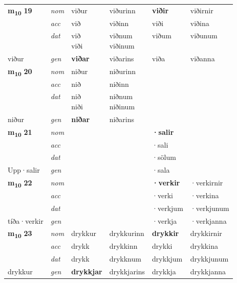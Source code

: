 \begin{longtable}[l]{X>{\footnotesize\itshape}XXXXX}
\multirow{3}{*}{{{\textbf{m{\textsubscript{10}}} \Large{\textbf{19}}}}} & nom & viður & viðurinn & \textbf{viðir} & viðirnir \\*
 & acc & við & viðinn & viði & viðina \\*
 & dat & \specialcell{við\\ viði} & \specialcell{viðnum\\ viðinum} & viðum & viðunum \\*
 {\footnotesize{viður}} & gen & \textbf{viðar} & viðarins & viða & viðanna \\
\cmidrule{1-6}

\multirow{3}{*}{{{\textbf{m{\textsubscript{10}}} \Large{\textbf{20}}}}} & nom & niður & niðurinn & \textbf{} &  \\*
 & acc & nið & niðinn &  &  \\*
 & dat & \specialcell{nið\\ niði} & \specialcell{niðnum\\ niðinum} &  &  \\*
 {\footnotesize{niður}} & gen & \textbf{niðar} & niðarins &  &  \\
\cmidrule{1-6}

\multirow{3}{*}{{{\textbf{m{\textsubscript{10}}} \Large{\textbf{21}}}}} & nom &  &  & \textbf{·salir} &  \\*
 & acc &  &  & ·sali &  \\*
 & dat &  &  & ·sölum &  \\*
 {\footnotesize{Upp\allowbreak ·salir}} & gen & \textbf{} &  & ·sala &  \\
\cmidrule{1-6}

\multirow{3}{*}{{{\textbf{m{\textsubscript{10}}} \Large{\textbf{22}}}}} & nom &  &  & \textbf{·verkir} & ·verkirnir \\*
 & acc &  &  & ·verki & ·verkina \\*
 & dat &  &  & ·verkjum & ·verkjunum \\*
 {\footnotesize{tíða\allowbreak ·verkir}} & gen & \textbf{} &  & ·verkja & ·verkjanna \\
\cmidrule{1-6}

\multirow{3}{*}{{{\textbf{m{\textsubscript{10}}} \Large{\textbf{23}}}}} & nom & drykkur & drykkurinn & \textbf{drykkir} & drykkirnir \\*
 & acc & drykk & drykkinn & drykki & drykkina \\*
 & dat & drykk & drykknum & drykkjum & drykkjunum \\*
 {\footnotesize{drykkur}} & gen & \textbf{drykkjar} & drykkjarins & drykkja & drykkjanna \\



\end{longtable}
